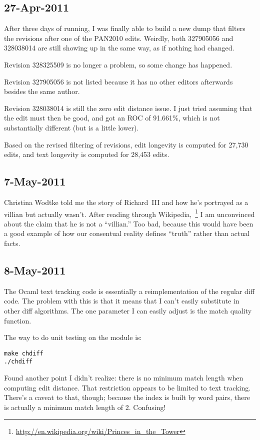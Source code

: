 \subsection{27-Apr-2011}

After three days of running, I was finally able to build a new dump
that filters the revisions after one of the PAN2010 edits.
Weirdly, both 327905056 and 328038014 are still showing up in the same way,
as if nothing had changed.

Revision 328325509 is no longer a problem, so some change has happened.

Revision 327905056 is not listed because it has no other editors
afterwards besides the same author.

Revision 328038014 is still the zero edit distance issue.
I just tried assuming that the edit must then be good,
and got an ROC of 91.661\%, which is not substantially different
(but is a little lower).

Based on the revised filtering of revisions, edit longevity is computed
for 27,730 edits, and text longevity is computed for 28,453 edits.

\subsection{7-May-2011}

Christina Wodtke told me the story of Richard~III and how
he's portrayed as a villian but actually wasn't.
After reading through
Wikipedia,~\footnote{\url{http://en.wikipedia.org/wiki/Princes_in_the_Tower}}
I am unconvinced about the claim that he is not a ``villian.''
Too bad, because this would have been a good example of how
our consentual reality defines ``truth'' rather than actual facts.

\subsection{8-May-2011}

The Ocaml text tracking code is essentially a reimplementation
of the regular diff code.
The problem with this is that it means that I can't easily substitute
in other diff algorithms.
The one parameter I can easily adjust is the match quality function.

The way to do unit testing on the  module is:
\begin{verbatim}
make chdiff
./chdiff
\end{verbatim}

Found another point I didn't realize: there is no minimum match length
when computing edit distance.
That restriction appears to be limited to text tracking.
There's a caveat to that, though; because the index is built
by word pairs, there is actually a minimum match length of 2.
Confusing!

